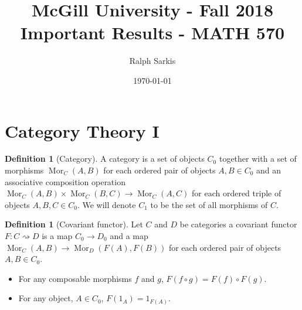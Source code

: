 \documentclass[paper=a4, fontsize=12pt]{scrartcl} %
\title{	
	\normalfont\normalsize 
	{McGill University - Fall 2018} \\ [0pt] %
	\Huge Important Results - MATH 570\vspace{-10pt}%
}\author{Ralph Sarkis} %
\date{\vspace{-10pt}\normalsize\today} %
\theoremstyle{definition}
\newtheorem{defn}[thm]{Definition}
\theoremstyle{remark}
\DeclareMathOperator{\Mor}{Mor}
\begin{document}
\maketitle
\section{Category Theory I}
\begin{defn}[Category]
	A category is a set of objects $C_0$ together with a set of morphisms $\Mor_{C}(A,B)$ for each ordered pair of objects $A, B\in C_0$ and an associative composition operation $\Mor_C(A,B) \times \Mor_C(B,C) \rightarrow \Mor_C(A,C)$ for each ordered triple of objects $A,B,C \in C_0$. We will denote $C_1$ to be the set of all morphisms of $C$.
\end{defn}
\begin{defn}[Covariant functor]
	Let $C$ and $D$ be categories a covariant functor $F: C\rightsquigarrow D$ is a map $C_0 \rightarrow D_0$ and a map $\Mor_C(A,B) \rightarrow \Mor_D(F(A),F(B))$ for each ordered pair of objects $A, B\in C_0$.
	\begin{itemize}
		\item For any composable morphisms $f$ and $g$, $F(f\circ g) = F(f) \circ F(g)$.
		\item For any object, $A \in C_0$, $F(1_A) = 1_{F(A)}$.
	\end{itemize}
\end{defn}
\end{document}
